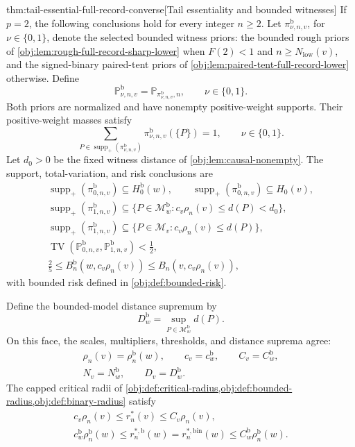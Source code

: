 \begin{theoremv}{thm:tail-essential-full-record-converse}[Tail essentiality and bounded witnesses]
If \(p=2\), the following conclusions hold for every integer \(n\ge2\).
Let \(\pi^{\mathrm b}_{\nu,n,v}\), for \(\nu\in\{0,1\}\), denote the selected bounded witness priors: the bounded rough priors of
\cref{obj:lem:rough-full-record-sharp-lower} when
\(F(2)<1\) and \(n\ge N_{\mathrm{low}}(v)\), and the signed-binary paired-tent priors of
\cref{obj:lem:paired-tent-full-record-lower} otherwise. Define
\[
\mathbb P^{\mathrm b}_{\nu,n,v}
=\mathbb P_{\pi^{\mathrm b}_{\nu,n,v},n},
\qquad \nu\in\{0,1\}.
\]
Both priors are normalized and have nonempty positive-weight supports. Their positive-weight masses satisfy
\[
\sum_{P\in\operatorname{supp}_+(\pi^{\mathrm b}_{\nu,n,v})}
\pi^{\mathrm b}_{\nu,n,v}(\{P\})=1,
\qquad \nu\in\{0,1\}.
\]
Let \(d_0>0\) be the fixed witness distance of
\cref{obj:lem:causal-nonempty}. The support, total-variation, and risk conclusions are
\[
\begin{gathered}
\operatorname{supp}_+(\pi^{\mathrm b}_{0,n,v})
\subseteq H_0^{\mathrm b}(w),
\qquad
\operatorname{supp}_+(\pi^{\mathrm b}_{0,n,v})
\subseteq H_0(v),\\
\operatorname{supp}_+(\pi^{\mathrm b}_{1,n,v})
\subseteq
\{P\in\mathcal M^{\mathrm b}_w:c_v\rho_n(v)\le d(P)<d_0\},\\
\operatorname{supp}_+(\pi^{\mathrm b}_{1,n,v})
\subseteq
\{P\in\mathcal M_v:c_v\rho_n(v)\le d(P)\},\\
\operatorname{TV}(\mathbb P^{\mathrm b}_{0,n,v},
                  \mathbb P^{\mathrm b}_{1,n,v})<\frac12,\\
\frac25\le B_n^{\mathrm b}(w,c_v\rho_n(v))
\le B_n(v,c_v\rho_n(v)),
\end{gathered}
\]
with bounded risk defined in \cref{obj:def:bounded-risk}.

Define the bounded-model distance supremum by
\[
D_w^{\mathrm b}=\sup_{P\in\mathcal M^{\mathrm b}_w}d(P).
\]
On this face, the scales, multipliers, thresholds, and distance suprema agree:
\[
\begin{gathered}
\rho_n(v)=\rho_n^{\mathrm b}(w),
\qquad c_v=c_w^{\mathrm b},
\qquad C_v=C_w^{\mathrm b},\\
N_v=N_w^{\mathrm b},
\qquad D_v=D_w^{\mathrm b}.
\end{gathered}
\]
The capped critical radii of
\cref{obj:def:critical-radius,obj:def:bounded-radius,obj:def:binary-radius}
satisfy
\[
\begin{gathered}
c_v\rho_n(v)\le r_n^*(v)\le C_v\rho_n(v),\\
c_w^{\mathrm b}\rho_n^{\mathrm b}(w)
\le r_n^{*,\mathrm b}(w)=r_n^{*,\mathrm{bin}}(w)
\le C_w^{\mathrm b}\rho_n^{\mathrm b}(w).
\end{gathered}
\]


\end{theoremv}
